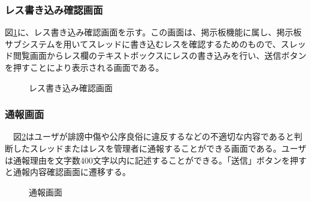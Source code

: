 \documentclass[a4j]{jarticle}
\begin{document}
\subsubsection{レス書き込み確認画面}
図\ref{fig:check_res}に、レス書き込み確認画面を示す。この画面は、掲示板機能に属し、掲示板サブシステムを用いてスレッドに書き込むレスを確認するためのもので、スレッド閲覧画面からレス欄のテキストボックスにレスの書き込みを行い、送信ボタンを押すことにより表示される画面である。
\begin{figure}[H]
\centering
{}
\caption{レス書き込み確認画面}
\label{fig:check_res}
\end{figure}

\subsubsection{通報画面}
　図\ref{fig:report_reason}はユーザが誹謗中傷や公序良俗に違反するなどの不適切な内容であると判断したスレッドまたはレスを管理者に通報することができる画面である。ユーザは通報理由を文字数400文字以内に記述することができる。「送信」ボタンを押すと通報内容確認画面に遷移する。
\begin{figure}[H]
\begin{center}
\caption{通報画面}
\label{fig:report_reason}
\end{center}
\end{figure}
\end{document}
